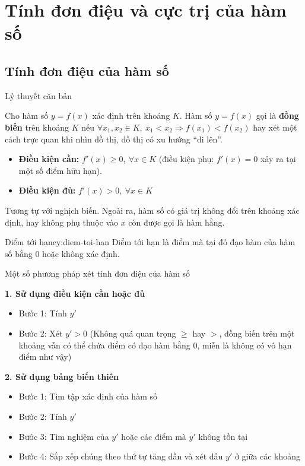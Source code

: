 \chapter{Tính đơn điệu và cực trị của hàm số}
\label{ch:chapter-1}

\section{Tính đơn điệu của hàm số}

\begin{lythuyetbox}{Lý thuyết căn bản}

Cho hàm số $y = f(x)$ xác định trên khoảng $K$.
Hàm số $y = f(x)$ gọi là \textbf{đồng biến} trên khoảng $K$ nếu $\forall x_1, x_2 \in K,\ x_1 < x_2 \Rightarrow f(x_1) < f(x_2)$ hay xét một cách trực quan khi nhìn đồ thị, đồ thị có xu hướng “đi lên”.

\begin{itemize}
    \item \textbf{Điều kiện cần:} $f'(x) \geq 0,\ \forall x \in K$ (điều kiện phụ: $f'(x) = 0$ xảy ra tại một số điểm hữu hạn).
    \item \textbf{Điều kiện đủ:} $f'(x) > 0,\ \forall x \in K$
\end{itemize}

Tương tự với nghịch biến. Ngoài ra, hàm số có giá trị không đổi trên khoảng xác định, hay không phụ thuộc vào $x$ còn được gọi là hàm hằng.

\begin{chuy}{Điểm tới hạn}{cy:diem-toi-han}
    Điểm tới hạn là điểm mà tại đó đạo hàm của hàm số bằng 0 hoặc không xác định.
\end{chuy}

\end{lythuyetbox}

\begin{lythuyetbox}{Một số phương pháp xét tính đơn điệu của hàm số}

\textbf{1. Sử dụng điều kiện cần hoặc đủ}

\begin{itemize}
    \item Bước 1: Tính $y'$
    \item Bước 2: Xét $y' > 0$ (Không quá quan trọng $\geq$ hay $>$, đồng biến trên một khoảng vẫn có thể chứa điểm có đạo hàm bằng 0, miễn là không có vô hạn điểm như vậy)
\end{itemize}

\textbf{2. Sử dụng bảng biến thiên}

\begin{itemize}
    \item Bước 1: Tìm tập xác định của hàm số
    \item Bước 2: Tính $y'$
    \item Bước 3: Tìm nghiệm của $y'$ hoặc các điểm mà $y'$ không tồn tại
    \item Bước 4: Sắp xếp chúng theo thứ tự tăng dần và xét dấu $y'$ ở giữa các khoảng
\end{itemize}

\end{lythuyetbox}

